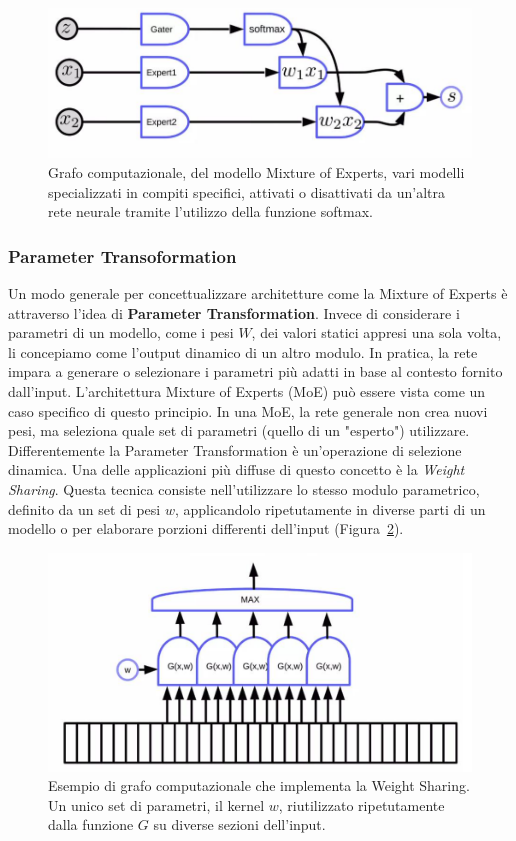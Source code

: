 \begin{figure}[htbp]
    \centering
    \includegraphics[width=0.5\linewidth]{figure/MixtureOfExpert.png}
    \caption{Grafo computazionale, del modello Mixture of Experts, vari modelli specializzati in compiti specifici, attivati o disattivati da un'altra rete neurale tramite l'utilizzo della funzione softmax.}
    \label{fig:mixExp}
\end{figure}

\subsubsection{Parameter Transoformation}

Un modo generale per concettualizzare architetture come la Mixture of Experts è attraverso l'idea di \textbf{Parameter Transformation}. Invece di considerare i parametri di un modello, come i pesi $W$, dei valori statici appresi una sola volta, li concepiamo come l'output dinamico di un altro modulo. In pratica, la rete impara a generare o selezionare i parametri più adatti in base al contesto fornito dall'input. L'architettura Mixture of Experts (MoE) può essere vista come un caso specifico di questo principio. In una MoE, la rete generale non crea nuovi pesi, ma seleziona quale set di parametri (quello di un "esperto") utilizzare. Differentemente la Parameter Transformation è un'operazione di selezione dinamica. Una delle applicazioni più diffuse di questo concetto è la \textit{Weight Sharing}. Questa tecnica consiste nell'utilizzare lo stesso modulo parametrico, definito da un set di pesi $w$, applicandolo ripetutamente in diverse parti di un modello o per elaborare porzioni differenti dell'input (Figura~\ref{fig:wshar}).

\begin{figure}[htbp]
    \centering
    \includegraphics[width=0.65\linewidth]{figure/WeightShar.png}
    \caption{Esempio di grafo computazionale che implementa la Weight Sharing. Un unico set di parametri, il kernel $w$, riutilizzato ripetutamente dalla funzione $G$ su diverse sezioni dell'input.}
    \label{fig:wshar}
\end{figure}

